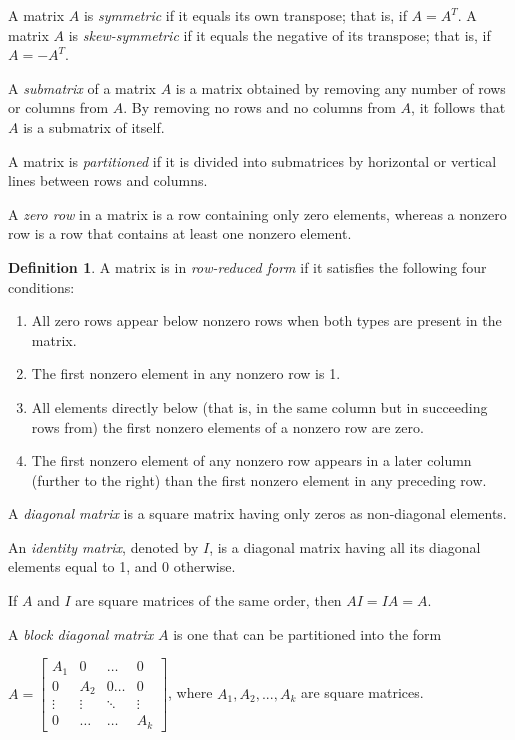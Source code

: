 \documentclass[11pt]{article}
\theoremstyle{definition}
\newtheorem{defn}{Definition}
\begin{document}
	A matrix $A$ is \textit{symmetric} if it equals its own transpose; that is, if $A = A^T$. A matrix $A$ is \textit{skew-symmetric} if it equals the negative of its transpose; that is, if $A = -A^T$.
	
	A \textit{submatrix} of a matrix $A$ is a matrix obtained by removing any number of rows or columns from $A$. By removing no rows and no columns from $A$, it follows that $A$ is a submatrix of itself.
	
	A matrix is \textit{partitioned} if it is divided into submatrices by horizontal or vertical lines between rows and columns.
	
	A \textit{zero row} in a matrix is a row containing only zero elements, whereas a nonzero row is a row that contains at least one nonzero element.
	
	\begin{defn}
		A matrix is in \textit{row-reduced form} if it satisfies the following four conditions:
		\begin{enumerate}
			\item All zero rows appear below nonzero rows when both types are present in the matrix.
			\item The first nonzero element in any nonzero row is 1.
			\item All elements directly below (that is, in the same column but in succeeding rows from) the first nonzero elements of a nonzero row are zero.
			\item The first nonzero element of any nonzero row appears in a later column (further to the right) than the first nonzero element in any preceding row.
		\end{enumerate}
	\end{defn}
	
	A \textit{diagonal matrix} is a square matrix having only zeros as non-diagonal elements.
	
	An \textit{identity matrix}, denoted by $I$, is a diagonal matrix having all its diagonal elements equal to 1, and 0 otherwise.
	
	If $A$ and $I$ are square matrices of the same order, then $AI = IA = A$.
	
	A \textit{block diagonal matrix} $A$ is one that can be partitioned into the form
	
	$A = \begin{bmatrix}
	A_{1} & 0 & \dots & 0 \\
	0 & A_{2} & 0 \dots & 0 \\
	\vdots & \vdots & \ddots & \vdots \\
	0  & \dots &\dots & A_{k}
	\end{bmatrix} $, where $A_1, A_2, ..., A_k$ are square matrices.
	
\end{document}
